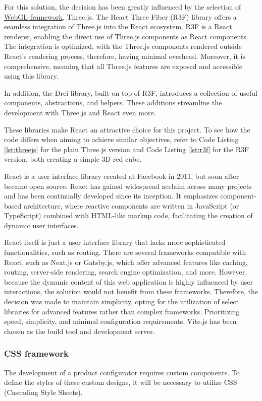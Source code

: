 For this solution, the decision has been greatly influenced by the selection of \hyperref[section:WebGL]{WebGL framework}, Three.js. The React Three Fiber (R3F) library offers a seamless integration of Three.js into the React ecosystem. R3F is a React renderer, enabling the direct use of Three.js components as React components. The integration is optimized, with the Three.js components rendered outside React's rendering process, therefore, having minimal overhead. Moreover, it is comprehensive, meaning that all Three.js features are exposed and accessible using this library. \cite{R3F}

In addition, the Drei library, built on top of R3F, introduces a collection of useful components, abstractions, and helpers. These additions streamline the development with Three.js and React even more. \cite{Drei}

These libraries make React an attractive choice for this project. To see how the code differs when aiming to achieve similar objectives, refer to Code Listing \ref{lst:threejs} for the plain Three.js version and Code Listing \ref{lst:r3f} for the R3F version, both creating a simple 3D red cube.

React is a user interface library created at Facebook in 2011, but soon after became open source. React has gained widespread acclaim across many projects and has been continually developed since its inception. It emphasizes component-based architecture, where reactive components are written in JavaScript (or TypeScript) combined with HTML-like markup code, facilitating the creation of dynamic user interfaces. \cite{Banks2020}

React itself is just a user interface library that lacks more sophisticated functionalities, such as routing. There are several frameworks compatible with React, such as Next.js or Gatsby.js, which offer advanced features like caching, routing, server-side rendering, search engine optimization, and more. However, because the dynamic content of this web application is highly influenced by user interactions, the solution would not benefit from these frameworks. \cite{Eze2023} Therefore, the decision was made to maintain simplicity, opting for the utilization of select libraries for advanced features rather than complex frameworks. Prioritizing speed, simplicity, and minimal configuration requirements, Vite.js has been chosen as the build tool and development server. \cite{Said2023}


\subsubsection{CSS framework}
The development of a product configurator requires custom components. To define the styles of these custom designs, it will be necessary to utilize CSS (Cascading Style Sheets).

